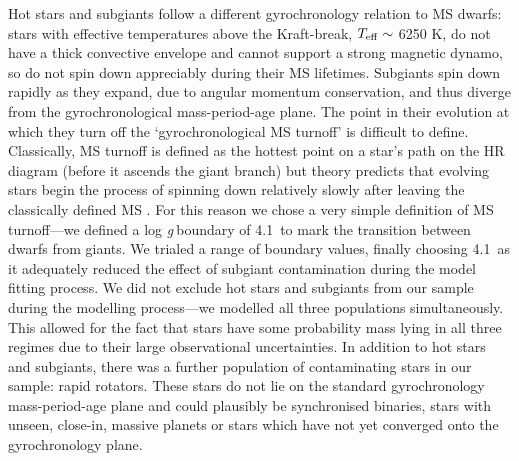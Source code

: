 \documentclass[11pt,preprint]{aastex}
\newcommand{\logg}{log \emph{g}}
\newcommand{\subcut}{4.1~}
\begin{document}
Hot stars and subgiants follow a different gyrochronology relation to MS dwarfs: stars with effective temperatures above the Kraft-break, $T_{\rm{eff}} \sim$ 6250 K, \citep{Kraft1967} do not have a thick convective envelope and cannot support a strong magnetic dynamo, so do not spin down appreciably during their MS lifetimes.
Subgiants spin down rapidly as they expand, due to angular momentum conservation, and thus diverge from the gyrochronological mass-period-age plane.
The point in their evolution at which they turn off the `gyrochronological MS turnoff' is difficult to define.
Classically, MS turnoff is defined as the hottest point on a star's path on the HR diagram (before it ascends the giant branch) but theory predicts that evolving stars begin the process of spinning down relatively slowly after leaving the classically defined MS \citep{vanSaders2013}.
For this reason we chose a very simple definition of MS turnoff---we defined a \logg$~$boundary of \subcut to mark the transition between dwarfs from giants.
We trialed a range of boundary values, finally choosing \subcut as it adequately reduced the effect of subgiant contamination during the model fitting process.
We did not exclude hot stars and subgiants from our sample during the modelling process---we modelled all three populations simultaneously.
This allowed for the fact that stars have some probability mass lying in all three regimes due to their large observational uncertainties.
In addition to hot stars and subgiants, there was a further population of contaminating stars in our sample: rapid rotators.
These stars do not lie on the standard gyrochronology mass-period-age plane and could plausibly be synchronised binaries, stars with unseen, close-in, massive planets \citep{Poppenhaeger2014, Beky2014} or stars which have not yet converged onto the gyrochronology plane.
\end{document}
